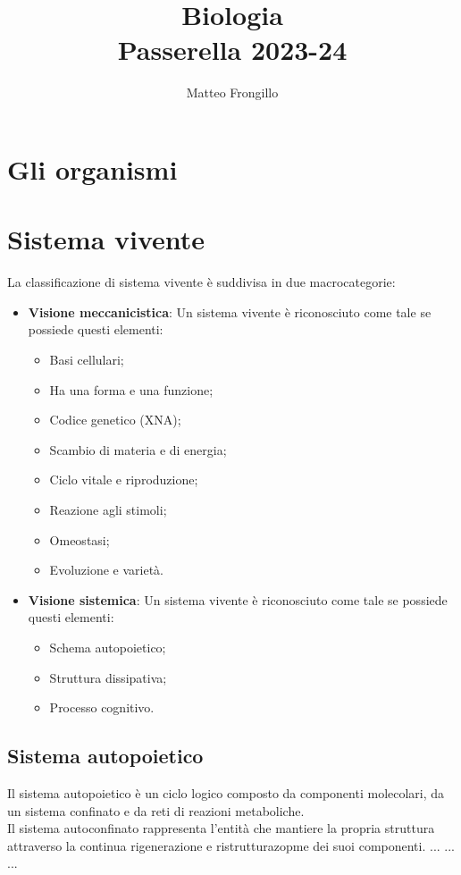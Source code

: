 \documentclass{article}
\title{\textbf{Biologia \\ Passerella 2023-24}}
\author{Matteo Frongillo}
\begin{document}
\maketitle
\tableofcontents
\pagebreak

\section{Gli organismi}

\section{Sistema vivente}
La classificazione di sistema vivente è suddivisa in due macrocategorie:
\begin{itemize}
    \item \textbf{Visione meccanicistica}: Un sistema vivente è riconosciuto come tale
        se possiede questi elementi:
        \begin{itemize}
            \item Basi cellulari;
            \item Ha una forma e una funzione;
            \item Codice genetico (XNA);
            \item Scambio di materia e di energia;
            \item Ciclo vitale e riproduzione;
            \item Reazione agli stimoli;
            \item Omeostasi;
            \item Evoluzione e varietà.
        \end{itemize}
    \item \textbf{Visione sistemica}: Un sistema vivente è riconosciuto come tale
        se possiede questi elementi:
        \begin{itemize}
            \item Schema autopoietico;
            \item Struttura dissipativa;
            \item Processo cognitivo.
        \end{itemize}
\end{itemize}

\subsection{Sistema autopoietico}
Il sistema autopoietico è un ciclo logico composto da componenti molecolari,
da un sistema confinato e da reti di reazioni metaboliche.\\
Il sistema autoconfinato rappresenta l'entità che mantiere la propria struttura
attraverso la continua rigenerazione e ristrutturazopme dei suoi componenti.
... ... ...
\end{document}
